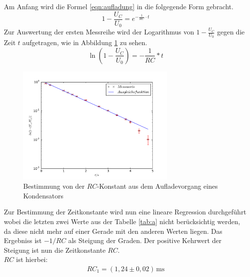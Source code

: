Am Anfang wird die Formel \eqref{eqn:aufladung} in die folgegende
Form gebracht.
\begin{equation}
1-\frac{U_C}{U_0}=e^{-{\frac{1}{RC}\cdot t}}
\end{equation}
Zur Auswertung der ersten Messreihe wird der Logarithmus
von $1-\frac{U_C}{U_0}$ gegen die Zeit $t$ aufgetragen, wie in Abbildung \ref{abb:a} zu sehen.
\begin{equation}
  \ln \left(1-\frac{U_C}{U_0}\right)=-\frac{1}{RC}*t
\end{equation}
\begin{figure}[!h]
  \centering
  \includegraphics[width=0.7\textwidth]{a.pdf}
  \caption{Bestimmung von der $RC$-Konstant aus dem
  Aufladevorgang eines Kondensators}
\label{abb:a}
\end{figure}
\FloatBarrier
Zur Bestimmung der Zeitkonstante wird nun eine lineare Regression
durchgeführt wobei die letzten zwei Werte aus der
Tabelle \ref{tab:a} nicht berücksichtig werden,
da diese nicht mehr auf einer Gerade mit den anderen Werten liegen.
Das Ergebniss ist $-1/RC$ als Steigung der Graden.
Der positive Kehrwert der Steigung ist nun die Zeitkonstante $RC$.\\
$RC$ ist hierbei:
\begin{align*}
RC_\mathrm{1}=(1,24\pm0,02)\,\si{\milli\second}
\end{align*}
